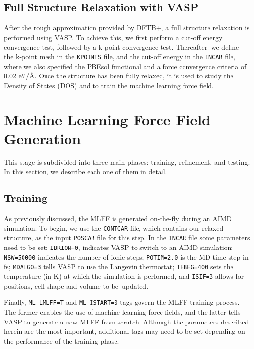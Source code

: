 \subsection{Full Structure Relaxation with VASP}
After the rough approximation provided by DFTB+, a full structure relaxation is performed using VASP. To achieve this, we first perform a cut-off energy convergence test, followed by a k-point convergence test. Thereafter, we define the k-point mesh in the \texttt{KPOINTS} file, and the cut-off energy in the \texttt{INCAR} file, where we also specified the PBEsol functional and a force convergence criteria of 0.02 eV/\AA. Once the structure has been fully relaxed, it is used to study the Density of States (DOS) and to train the machine learning force field.

\section{Machine Learning Force Field Generation}
\label{sec:mlff-generation}
This stage is subdivided into three main phases: training, refinement, and testing. In this section, we describe each one of them in detail.
\subsection{Training}
As previously discussed, the MLFF is generated on-the-fly during an AIMD simulation. To begin, we use the \texttt{CONTCAR} file, which contains our relaxed structure, as the input \texttt{POSCAR} file for this step. In the \texttt{INCAR} file some parameters need to be set: \texttt{IBRION=0}, indicates VASP to switch to an AIMD simulation; \texttt{NSW=50000} indicates the number of ionic steps; \texttt{POTIM=2.0} is the MD time step in fs; \texttt{MDALGO=3} tells VASP to use the Langevin thermostat; \texttt{TEBEG=400} sets the temperature (in K) at which the simulation is performed, and \texttt{ISIF=3} allows for positions, cell shape and volume to be~updated. 

Finally, \texttt{ML\_LMLFF=T} and \texttt{ML\_ISTART=0} tags govern the MLFF training process. The former enables the use of machine learning force fields, and the latter tells VASP to generate a new MLFF from scratch. Although the parameters described herein are the most important, additional tags may need to be set depending on the performance of the training phase.


